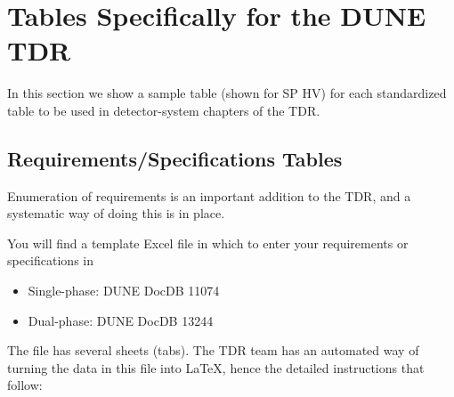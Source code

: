 \FloatBarrier

\section{Tables Specifically for the DUNE TDR}
\label{sec:tables}

In this section we show a sample table (shown for SP HV) for each standardized table to be used in detector-system chapters of the TDR. 

\subsection{Requirements/Specifications Tables}
\label{sec:tables-req}

Enumeration of requirements is an important addition to the TDR, and a systematic way of doing this is in place.  

You will find a template Excel file in which to enter your requirements or specifications in
\begin{itemize}
\item Single-phase: DUNE DocDB 11074~\cite{bib:docdb11074} 
\item Dual-phase: DUNE DocDB 13244~\cite{bib:docdb13244} 
\end{itemize}
The file has several sheets (tabs). The TDR team has an automated way of turning the data in this file into LaTeX, hence the detailed instructions that follow:


